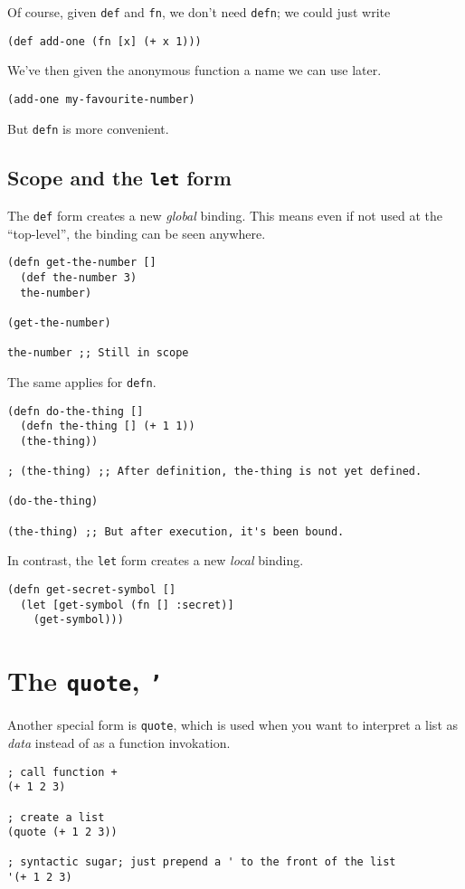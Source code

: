 \documentclass[11pt]{article}
\begin{document}
Of course, given \texttt{def} and \texttt{fn}, we don't need \texttt{defn};
we could just write
\begin{verbatim}
(def add-one (fn [x] (+ x 1)))
\end{verbatim}

We've then given the anonymous function a name we can use later.
\begin{verbatim}
(add-one my-favourite-number)
\end{verbatim}

But \texttt{defn} is more convenient.

\subsection{Scope and the \texttt{let} form}
\label{sec:org4335b42}
The \texttt{def} form creates a new \emph{global} binding.
This means even if not used at the “top-level”,
the binding can be seen anywhere.
\begin{verbatim}
(defn get-the-number []
  (def the-number 3)
  the-number)

(get-the-number)

the-number ;; Still in scope
\end{verbatim}

The same applies for \texttt{defn}.
\begin{verbatim}
(defn do-the-thing []
  (defn the-thing [] (+ 1 1))
  (the-thing))

; (the-thing) ;; After definition, the-thing is not yet defined.

(do-the-thing)

(the-thing) ;; But after execution, it's been bound.
\end{verbatim}

In contrast, the \texttt{let} form creates a new \emph{local} binding.
\begin{verbatim}
(defn get-secret-symbol []
  (let [get-symbol (fn [] :secret)]
    (get-symbol)))
\end{verbatim}

\section{The \texttt{quote}, \texttt{'}}
\label{sec:org7a3684e}
Another special form is \texttt{quote}, which is used
when you want to interpret a list as \emph{data} instead
of as a function invokation.
\begin{verbatim}
; call function +
(+ 1 2 3)

; create a list
(quote (+ 1 2 3))

; syntactic sugar; just prepend a ' to the front of the list
'(+ 1 2 3)
\end{verbatim}
\end{document}
